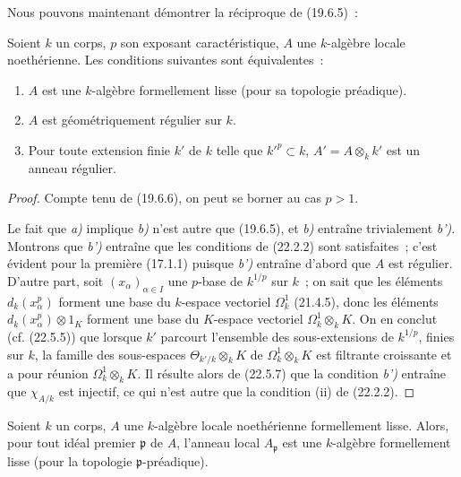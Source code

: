 Nous pouvons maintenant démontrer la réciproque de (19.6.5)~:

\begin{theorem}[22.5.8]
\label{0.22.5.8-fr}
Soient $k$ un corps, $p$ son exposant caractéristique, $A$ une $k$-algèbre
locale noethérienne. Les conditions suivantes sont équivalentes~:
\begin{enumerate}
  \item[\textup{a)}] $A$ est une $k$-algèbre formellement lisse (pour sa topologie
  préadique).
  \item[\textup{b)}] $A$ est géométriquement régulier sur $k$.
  \item[\textup{b')}] Pour toute extension finie $k'$ de $k$ telle que $k'^p\subset k$,
  $A'=A\otimes_kk'$ est un anneau régulier.
\end{enumerate}
\end{theorem}

\begin{proof}
Compte tenu de (19.6.6), on peut se borner au cas $p>1$.

Le fait que \emph{a)} implique \emph{b)} n'est autre que (19.6.5), et \emph{b)} entraîne
trivialement \emph{b')}. Montrons que \emph{b')} entraîne que les conditions de (22.2.2) sont
satisfaites~; c'est évident pour la première (17.1.1) puisque \emph{b')} entraîne
d'abord que $A$ est régulier. D'autre part, soit $(x_\alpha)_{\alpha\in I}$ une
$p$-base de $k^{1/p}$ sur $k$~; on sait que les éléments $d_k(x_\alpha^p)$
forment une base du $k$-espace vectoriel $\Omega^1_k$ (21.4.5), donc les
éléments $d_k(x_\alpha^p)\otimes1_K$ forment une base du $K$-espace vectoriel
$\Omega^1_k\otimes_kK$. On en conclut (cf. (22.5.5)) que lorsque $k'$ parcourt
l'ensemble des sous-extensions de $k^{1/p}$, finies sur $k$, la famille des
sous-espaces $\Theta_{k'/k}\otimes_kK$ de $\Omega^1_k\otimes_kK$ est filtrante
croissante et a pour réunion $\Omega^1_k\otimes_kK$. Il résulte alors de
(22.5.7) que la condition \emph{b')} entraîne que $\chi_{A/k}$ est injectif, ce qui
n'est autre que la condition (ii) de (22.2.2).
\end{proof}

\begin{corollary}[22.5.9]
\label{0.22.5.9-fr}
Soient $k$ un corps, $A$ une $k$-algèbre locale noethérienne formellement
lisse. Alors, pour tout idéal premier $\mathfrak p$ de $A$, l'anneau local
$A_{\mathfrak p}$ est une $k$-algèbre formellement lisse (pour la topologie
$\mathfrak p$-préadique).
\end{corollary}

